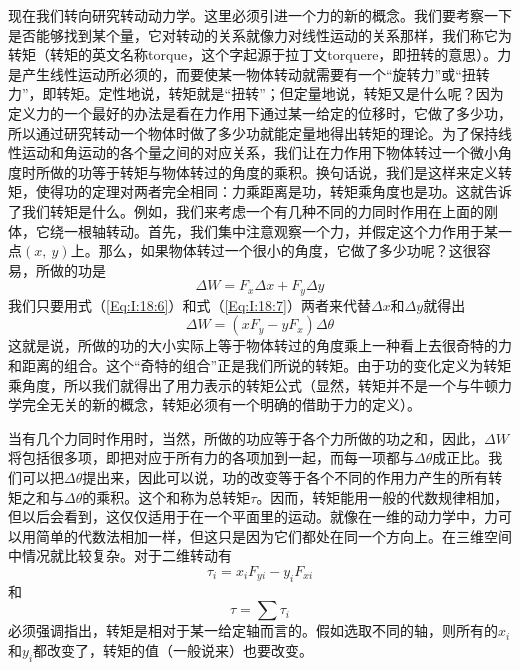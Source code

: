 现在我们转向研究转动动力学。这里必须引进一个力的新的概念。我们要考察一下是否能够找到某个量，它对转动的关系就像力对线性运动的关系那样，我们称它为转矩（转矩的英文名称torque，这个字起源于拉丁文torquere，即扭转的意思）。力是产生线性运动所必须的，而要使某一物体转动就需要有一个“旋转力”或“扭转力”，即转矩。定性地说，转矩就是“扭转”；但定量地说，转矩又是什么呢？因为定义力的一个最好的办法是看在力作用下通过某一给定的位移时，它做了多少功，所以通过研究转动一个物体时做了多少功就能定量地得出转矩的理论。为了保持线性运动和角运动的各个量之间的对应关系，我们让在力作用下物体转过一个微小角度时所做的功等于转矩与物体转过的角度的乘积。换句话说，我们是这样来定义转矩，使得功的定理对两者完全相同：力乘距离是功，转矩乘角度也是功。这就告诉了我们转矩是什么。例如，我们来考虑一个有几种不同的力同时作用在上面的刚体，它绕一根轴转动。首先，我们集中注意观察一个力，并假定这个力作用于某一点$(x,~y)$上。那么，如果物体转过一个很小的角度，它做了多少功呢？这很容易，所做的功是
\begin{equation}
    \label{Eq:I:18:10}
    \Delta W = F_x \Delta x + F_y \Delta y
\end{equation}
我们只要用式（\ref{Eq:I:18:6}）和式（\ref{Eq:I:18:7}）两者来代替$\Delta x$和$\Delta y$就得出
\begin{equation}
    \label{Eq:I:18:11}
    \Delta W = (xF_y - yF_x) \Delta \theta
\end{equation}
这就是说，所做的功的大小实际上等于物体转过的角度乘上一种看上去很奇特的力和距离的组合。这个“奇特的组合”正是我们所说的转矩。由于功的变化定义为转矩乘角度，所以我们就得出了用力表示的转矩公式（显然，转矩并不是一个与牛顿力学完全无关的新的概念，转矩必须有一个明确的借助于力的定义）。

当有几个力同时作用时，当然，所做的功应等于各个力所做的功之和，因此，$\Delta W$将包括很多项，即把对应于所有力的各项加到一起，而每一项都与$\Delta \theta$成正比。我们可以把$\Delta \theta$提出来，因此可以说，功的改变等于各个不同的作用力产生的所有转矩之和与$\Delta \theta$的乘积。这个和称为总转矩$\tau$。因而，转矩能用一般的代数规律相加，但以后会看到，这仅仅适用于在一个平面里的运动。就像在一维的动力学中，力可以用简单的代数法相加一样，但这只是因为它们都处在同一个方向上。在三维空间中情况就比较复杂。对于二维转动有
\begin{equation}
    \label{Eq:I:18:12}
    \tau_i = x_iF_{yi} - y_iF_{xi}
\end{equation}
和
\begin{equation}
    \label{Eq:I:18:13}
    \tau = \sum \tau_i
\end{equation}
必须强调指出，转矩是相对于某一给定轴而言的。假如选取不同的轴，则所有的$x_i$和$y_i$都改变了，转矩的值（一般说来）也要改变。

